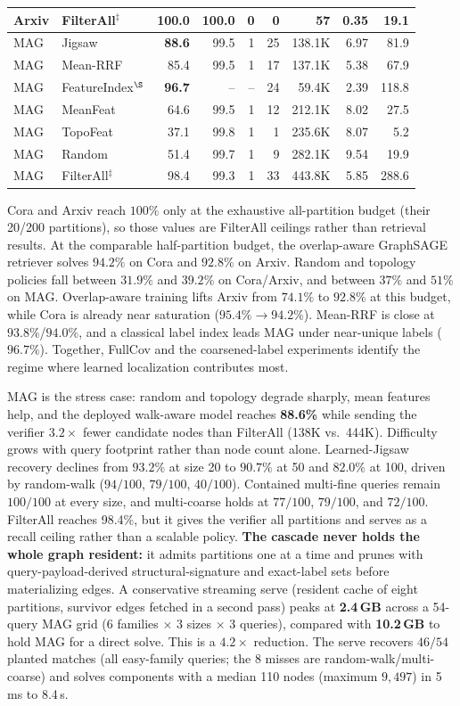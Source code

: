 \documentclass{article}
\begin{document}
\begin{table}[t]
\begin{tabular}{llrrrrrrr}
Arxiv & FilterAll$^\ddagger$ & 100.0 & 100.0 & 0 & 0 & 57 & 0.35 & 19.1 \\
\midrule
MAG & Jigsaw & \textbf{88.6} & 99.5 & 1 & 25 & 138.1K & 6.97 & 81.9 \\
MAG & Mean-RRF & 85.4 & 99.5 & 1 & 17 & 137.1K & 5.38 & 67.9 \\
MAG & FeatureIndex$^\S$ & \textbf{96.7} & -- & -- & 24 & 59.4K & 2.39 & 118.8 \\
MAG & MeanFeat & 64.6 & 99.5 & 1 & 12 & 212.1K & 8.02 & 27.5 \\
MAG & TopoFeat & 37.1 & 99.8 & 1 & 1 & 235.6K & 8.07 & 5.2 \\
MAG & Random & 51.4 & 99.7 & 1 & 9 & 282.1K & 9.54 & 19.9 \\
MAG & FilterAll$^\ddagger$ & 98.4 & 99.3 & 1 & 33 & 443.8K & 5.85 & 288.6 \\
\bottomrule
\end{tabular}
\end{table}

Cora and Arxiv reach $100\%$ only at the exhaustive all-partition budget (their 20/200 partitions), so those values are FilterAll ceilings rather than retrieval results. At the comparable half-partition budget, the overlap-aware GraphSAGE retriever solves $94.2\%$ on Cora and $92.8\%$ on Arxiv. Random and topology policies fall between $31.9\%$ and $39.2\%$ on Cora/Arxiv, and between $37\%$ and $51\%$ on MAG. Overlap-aware training lifts Arxiv from $74.1\%$ to $92.8\%$ at this budget, while Cora is already near saturation ($95.4\%\!\to\!94.2\%$). Mean-RRF is close at $93.8\%$/$94.0\%$, and a classical label index leads MAG under near-unique labels ($96.7\%$). Together, FullCov and the coarsened-label experiments identify the regime where learned localization contributes most.

MAG is the stress case: random and topology degrade sharply, mean features help, and the deployed walk-aware model reaches \textbf{88.6\%} while sending the verifier $3.2\times$ fewer candidate nodes than FilterAll (138K vs.\ 444K). Difficulty grows with query footprint rather than node count alone. Learned-Jigsaw recovery declines from $93.2\%$ at size 20 to $90.7\%$ at 50 and $82.0\%$ at 100, driven by random-walk ($94/100$, $79/100$, $40/100$). Contained multi-fine queries remain $100/100$ at every size, and multi-coarse holds at $77/100$, $79/100$, and $72/100$. FilterAll reaches 98.4\%, but it gives the verifier all partitions and serves as a recall ceiling rather than a scalable policy. \textbf{The cascade never holds the whole graph resident:} it admits partitions one at a time and prunes with query-payload-derived structural-signature and exact-label sets before materializing edges. A conservative streaming serve (resident cache of eight partitions, survivor edges fetched in a second pass) peaks at \textbf{2.4\,GB} across a 54-query MAG grid (6 families $\times$ 3 sizes $\times$ 3 queries), compared with \textbf{10.2\,GB} to hold MAG for a direct solve. This is a $4.2\times$ reduction. The serve recovers $46/54$ planted matches (all easy-family queries; the 8 misses are random-walk/multi-coarse) and solves components with a median 110 nodes (maximum $9{,}497$) in 5\,ms to 8.4\,s.
\end{document}
